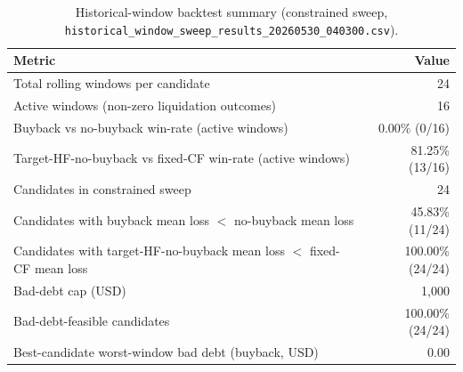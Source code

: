\begin{table}[h!]
\centering
\caption{Historical-window backtest summary (constrained sweep, \texttt{historical\_window\_sweep\_results\_20260530\_040300.csv}).}
\label{tab:historical_window_summary}
\begin{tabular}{@{}lr@{}}
\toprule
Metric & Value \\
\midrule
Total rolling windows per candidate & 24 \\
Active windows (non-zero liquidation outcomes) & 16 \\
Buyback vs no-buyback win-rate (active windows) & 0.00\% (0/16) \\
Target-HF-no-buyback vs fixed-CF win-rate (active windows) & 81.25\% (13/16) \\
Candidates in constrained sweep & 24 \\
Candidates with buyback mean loss $<$ no-buyback mean loss & 45.83\% (11/24) \\
Candidates with target-HF-no-buyback mean loss $<$ fixed-CF mean loss & 100.00\% (24/24) \\
Bad-debt cap (USD) & 1{,}000 \\
Bad-debt-feasible candidates & 100.00\% (24/24) \\
Best-candidate worst-window bad debt (buyback, USD) & 0.00 \\
\bottomrule
\end{tabular}
\end{table}
